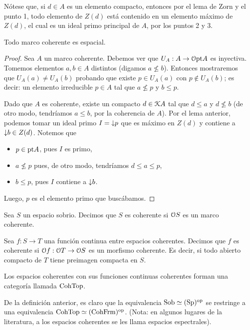 Nótese que, si $d\in A$ es un elemento compacto,
entonces por el lema de Zorn y el punto 1,
todo elemento de $Z(d)$ está contenido en un elemento máximo de
$Z(d)$, el cual es un ideal primo principal de $A$,
por los puntos 2 y 3.


\begin{lemma}
    Todo marco coherente es espacial.
\end{lemma}
\begin{proof}
    Sea $A$ un marco coherente.
    Debemos ver que $U_A:A\to\cal O\pt A$ es inyectiva.
    Tomemos elementos $a,b\in A$ distintos (digamos $a\nleq b$).
    Entonces mostraremos que $U_A(a)\neq U_A(b)$
    probando que existe $p\in U_A(a)$ con $p\nin U_A(b)$;
    es decir: un elemento irreducible $p\in A$
    tal que $a\nleq p$ y $b\leq p$.
    
    Dado que $A$ es coherente, existe un compacto $d\in\cal KA$
    tal que $d\leq a$ y $d\nleq b$
    (de otro modo, tendríamos $a\leq b$, por la coherencia de $A$).
    Por el lema anterior, podemos tomar un ideal primo
    $I=\down p$ que es máximo en $Z(d)$
    y contiene a $\down b\in Z(d)$.
    Notemos que
    \begin{itemize}
        \item $p\in\pt A$, pues $I$ es primo,
        \item $a\nleq p$ pues, de otro modo,
        tendríamos $d\leq a\leq p$,
        \item $b\leq p$, pues $I$ contiene a $\down b$.
    \end{itemize}
    Luego, $p$ es el elemento primo que buscábamos.
\end{proof}

\begin{definition}
    Sea $S$ un espacio sobrio.
    Decimos que $S$ es coherente
    si $\cal OS$ es un marco coherente.
    
    Sea $f:S\to T$ una función continua entre espacios coherentes.
    Decimos que $f$ es coherente si $\cal Of:\cal OT\to\cal OS$
    es un morfismo coherente.
    Es decir, si todo abierto compacto de $T$ tiene preimagen
    compacta en $S$.
    
    Los espacios coherentes con sus funciones continuas
    coherentes forman una categoría llamada $\CohTop$.
\end{definition}

De la definición anterior,
es claro que la equivalencia $\Sob\simeq(\Sp)^\op$
se restringe a una equivalencia $\CohTop\simeq(\CohFrm)^\op$.
(Nota: en algunos lugares de la literatura, a los espacios
coherentes se les llama espacios espectrales).

